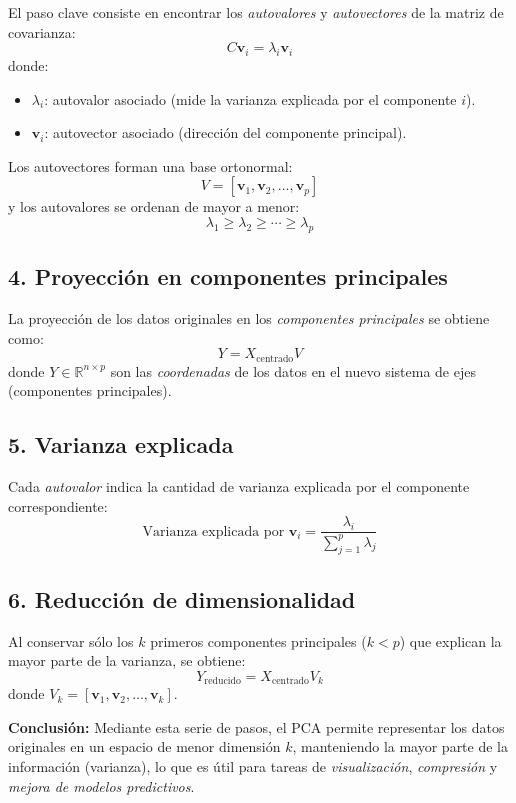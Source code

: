 \documentclass[12pt]{article}
\begin{document}
El paso clave consiste en encontrar los \emph{autovalores} y \emph{autovectores} de la matriz de covarianza:
\[
C \mathbf{v}_i = \lambda_i \mathbf{v}_i
\]
donde:
\begin{itemize}
	\item \(\lambda_i\): autovalor asociado (mide la varianza explicada por el componente \( i \)).
	\item \(\mathbf{v}_i\): autovector asociado (dirección del componente principal).
\end{itemize}

Los autovectores forman una base ortonormal:
\[
V = [\mathbf{v}_1, \mathbf{v}_2, \ldots, \mathbf{v}_p]
\]
y los autovalores se ordenan de mayor a menor:
\[
\lambda_1 \geq \lambda_2 \geq \cdots \geq \lambda_p
\]

\subsection*{4. Proyección en componentes principales}

La proyección de los datos originales en los \emph{componentes principales} se obtiene como:
\[
Y = X_{\text{centrado}} V
\]
donde \( Y \in \mathbb{R}^{n \times p} \) son las \emph{coordenadas} de los datos en el nuevo sistema de ejes (componentes principales).

\subsection*{5. Varianza explicada}

Cada \emph{autovalor} indica la cantidad de varianza explicada por el componente correspondiente:
\[
\text{Varianza explicada por } \mathbf{v}_i = \frac{\lambda_i}{\sum_{j=1}^p \lambda_j}
\]

\subsection*{6. Reducción de dimensionalidad}

Al conservar sólo los \( k \) primeros componentes principales (\( k < p \)) que explican la mayor parte de la varianza, se obtiene:
\[
Y_{\text{reducido}} = X_{\text{centrado}} V_k
\]
donde \( V_k = [\mathbf{v}_1, \mathbf{v}_2, \ldots, \mathbf{v}_k] \).

\vspace{1em}
\noindent
\textbf{Conclusión:} Mediante esta serie de pasos, el PCA permite representar los datos originales en un espacio de menor dimensión \( k \), manteniendo la mayor parte de la información (varianza), lo que es útil para tareas de \emph{visualización}, \emph{compresión} y \emph{mejora de modelos predictivos}.
\end{document}
